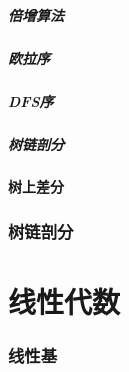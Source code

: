 \documentclass[12pt,a4paper]{article}
\begin{document}
\subsubsection{倍增算法}
\subsubsection{欧拉序}
\subsubsection{DFS序}
\subsubsection{树链剖分}
\subsection{树上差分}
\newpage
\section{树链剖分}

\newpage
\part{线性代数}
\section{线性基}
\end{document}
